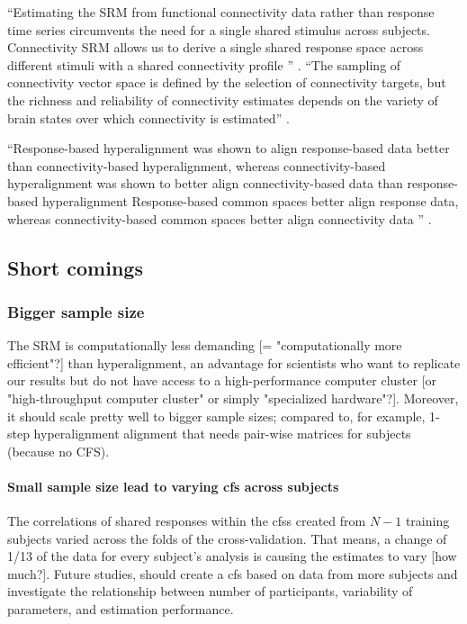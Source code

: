 ``Estimating the SRM from functional connectivity data rather than response time
series circumvents the need for a single shared stimulus across subjects.
%
Connectivity SRM allows us to derive a single shared response space across
different stimuli with a shared connectivity profile
\citep{nastase2019leveraging}'' \citep{kumar2020brainiak}.
%
``The sampling of connectivity vector space is defined by the selection of
connectivity targets, but the richness and reliability of connectivity estimates
depends on the variety of brain states over which connectivity is estimated''
\citep{haxby2020hyperalignment}.


%
``Response-based hyperalignment was shown to align response-based data better
than connectivity-based hyperalignment, whereas connectivity-based
hyperalignment was shown to better align connectivity-based data than
response-based hyperalignment
%
Response-based common spaces better align response data, whereas
connectivity-based common spaces better align connectivity data
\citep{guntupalli2018computational}'' \citep{busch2021hybrid}.


\subsection{Short comings}


\subsubsection{Bigger sample size}
%
The SRM is computationally less demanding [= "computationally more efficient"?]
than hyperalignment, an advantage for scientists who want to replicate our
results but do not have access to a high-performance computer cluster [or
"high-throughput computer cluster" or simply "specialized hardware"?].
%
Moreover, it should scale pretty well to bigger sample sizes; compared to, for
example, \citet{jiahui2020predicting, jiahui2022cross} 1-step hyperalignment
alignment that needs pair-wise matrices for subjects (because no CFS).


\paragraph{Small sample size lead to varying \ac{cfs} across subjects}
The correlations of shared responses within the \acp{cfs} created from $N-1$
training subjects varied across the folds of the cross-validation.
That means, a change of 1/13 of the data for every subject's analysis is causing
the estimates to vary [how much?].
Future studies, should create a \ac{cfs} based on data from more subjects and
investigate the relationship between number of participants, variability of
parameters, and estimation performance.


